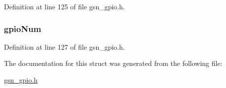 Definition at line 125 of file gsn\_\-gpio.h.

\hypertarget{a00018_ae1937e31f4be10cef2fb04c31b6ae195}{
\subsubsection[{gpioNum}]{ {\bf gpioNum}}}
\label{a00018_ae1937e31f4be10cef2fb04c31b6ae195}


Definition at line 127 of file gsn\_\-gpio.h.



The documentation for this struct was generated from the following file:\begin{DoxyCompactItemize}
\item 
\hyperlink{a00503}{gsn\_\-gpio.h}\end{DoxyCompactItemize}
